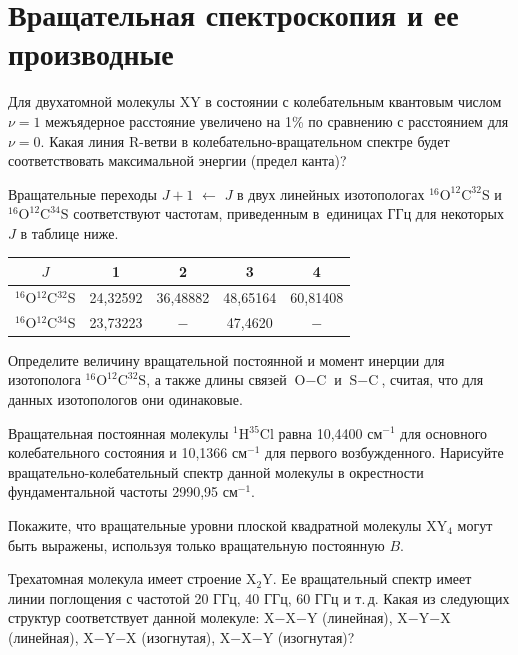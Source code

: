 \setmainfont{Noto Serif}
\setsansfont{Noto Sans}
\setmonofont{Noto Sans Mono}

\section{Вращательная спектроскопия и ее производные}
 Для двухатомной молекулы XY в состоянии с колебательным квантовым числом $\nu = 1$ межъядерное расстояние увеличено на 1\% по сравнению с расстоянием для $\nu = 0$. Какая линия R-ветви в колебательно-вращательном спектре будет соответствовать максимальной энергии (предел канта)?
\par
{} Вращательные переходы $J + 1$ $\leftarrow$ $J$ в двух линейных изотопологах $^{16}\text{O}^{12}\text{C}^{32}\text{S}$ и~$^{16}\text{O}^{12}\text{C}^{34}\text{S}$ соответствуют частотам, приведенным в~единицах ГГц для некоторых $J$ в таблице ниже.
\begin{center}
\begin{tabular}{ c c c c c }

 $J$ & 1 & 2 & 3 & 4 \\
 \hline
 $^{16}$O$^{12}$C$^{32}$S & 24,32592 & 36,48882 & 48,65164 & 60,81408 \\
 $^{16}$O$^{12}$C$^{34}$S & 23,73223 & $-$ & 47,4620 & $-$
\end{tabular}
\end{center}
Определите величину вращательной постоянной и момент инерции для изотополога $^{16}\text{O}^{12}\text{C}^{32}\text{S}$, а также длины связей $\text{O}-\text{C}$ и $\text{S}-\text{C}$, считая, что для данных изотопологов они одинаковые.
\par
{} Вращательная постоянная молекулы $^1$H$^{35}$Cl равна 10,4400 см$^{-1}$ для основного колебательного состояния и 10,1366 см$^{-1}$ для первого возбужденного. Нарисуйте вращательно-колебательный спектр данной молекулы в окрестности фундаментальной частоты 2990,95 см$^{-1}$.
\par
{} Покажите, что вращательные уровни плоской квадратной молекулы XY$_4$ могут быть выражены, используя только вращательную постоянную $B$.
\par
{} Трехатомная молекула имеет строение X$_2$Y. Ее вращательный спектр имеет линии поглощения с частотой 20 ГГц, 40 ГГц, 60 ГГц и т.\,д. Какая из следующих структур соответствует данной молекуле: X$-$X$-$Y (линейная), X$-$Y$-$X (линейная), X$-$Y$-$X (изогнутая), X$-$X$-$Y (изогнутая)?
\par
